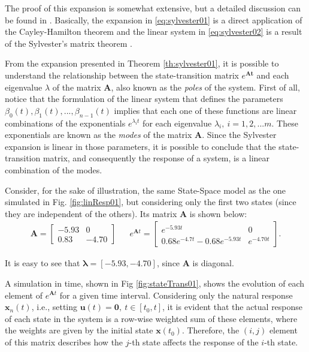 \documentclass[a4paper,11pt]{book}
\numberwithin{figure}{chapter}
\numberwithin{equation}{chapter}
\numberwithin{table}{chapter}
\theoremstyle{definition}
\newtheorem{example}{Example}[chapter]
\newcounter{boxed-theorem}
\newcounter{boxed-definition}
\newcounter{boxed-example}
\newenvironment{boxed-example}[1]
{\colorlet{shadecolor}{pastelRed!20} \begin{shaded} \begin{example}{#1}}
{\end{example} \end{shaded}}
\begin{document}
The proof of this expansion is somewhat extensive, but a detailed discussion can be found in \cite{Chen:1998}. Basically, the expansion in \eqref{eq:sylvester01} is a direct application of the Cayley-Hamilton theorem \cite{Atiyah:2018} and the linear system in \eqref{eq:sylvester02} is a result of the Sylvester's matrix theorem \cite{Horn:2012}.

From the expansion presented in Theorem \ref{th:sylvester01}, it is possible to understand the relationship between the state-transition matrix $e^{\bm{At}}$ and each eigenvalue $\lambda$ of the matrix $\bm{A}$, also known as the \textit{poles} of the system. First of all, notice that the formulation of the linear system that defines the parameters $\beta_0(t), \beta_1(t), ..., \beta_{n-1}(t)$ implies that each one of these functions are linear combinations of the exponentials $e^{\lambda_i t}$ for each eigenvalue $\lambda_i,\ i=1,2,...m$. These exponentials are known as the \textit{modes} of the matrix $\bm{A}$. Since the Sylvester expansion is linear in those parameters, it is possible to conclude that the state-transition matrix, and consequently the response of a system, is a linear combination of the modes.

\begin{boxed-example}
	Consider, for the sake of illustration, the same State-Space model as the one simulated in Fig. \ref{fig:linResp01}, but considering only the first two states (since they are independent of the others). Its matrix $\bm{A}$ is shown below:
	\begin{align} \label{eq:stateRespEx01}
	    \bm{A} = \begin{bmatrix} 
	        -5.93  &        0 \\
	        0.83   &  -4.70 
	    \end{bmatrix} && e^{\bm{A} t} = \begin{bmatrix} 
	        e^{-5.93 t}  &        0 \\
	        0.68 e^{-4.7 t} - 0.68 e^{-5.93 t}  &  e^{-4.70 t} 
	    \end{bmatrix}
	.\end{align}
	
\noindent It is easy to see that $\bm{\lambda} = [-5.93, -4.70]$, since $\bm{A}$ is diagonal. 
	
	A simulation in time, shown in Fig \ref{fig:stateTrans01}, shows the evolution of each element of $e^{\bm{A} t}$ for a given time interval. Considering only the natural response $\bm{x}_n(t)$, i.e., setting $\bm{u}(t) = \bm{0},\ t \in [t_0, t]$, it is evident that the actual response of each state in the system is a row-wise weighted sum of these elements, where the weights are given by the initial state $\bm{x}(t_0)$. Therefore, the $(i, j)$ element of this matrix describes how the $j$-th state affects the response of the $i$-th state.
\end{boxed-example}
\end{document}
